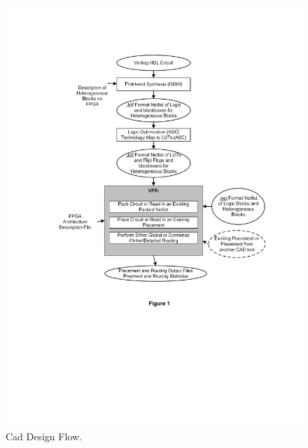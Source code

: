 \documentclass[12pt,final,oneside,a4paper]{dwThesis} %
\begin{document}
   \begin{figure}

      \begin{center}
         \includegraphics*[viewport=40 280 550 750]{images/VPRCAD.pdf}
         \caption{Cad Design Flow.\cite{VPRManual}} \label{CADFlow}

      \end{center}

   \end{figure}
\end{document}
